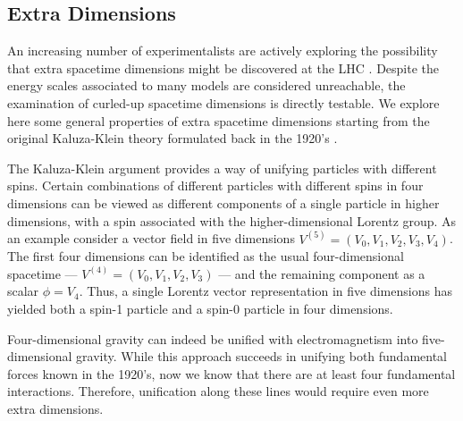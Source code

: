 \subsection{Extra Dimensions}

An increasing number of experimentalists are actively exploring the possibility that extra spacetime dimensions might be discovered at the LHC  \cite{Csaki:2004ay}. Despite the energy scales associated to many models are considered unreachable, the examination of curled-up spacetime dimensions is directly testable. We explore here some general properties of extra spacetime dimensions starting from the original Kaluza-Klein theory formulated back in the 1920's \cite{Kaluza:1921tu}. 

The Kaluza-Klein argument provides a way of unifying particles with different spins. Certain combinations of different particles with different spins in four dimensions can be viewed as different components of a single particle in higher dimensions, with a spin associated with the higher-dimensional Lorentz group. As an example consider a vector field in five dimensions $V^{(5)} = (V_0, V_1, V_2, V_3, V_4)$. The first four dimensions can be identified as the usual four-dimensional spacetime --- $V^{(4)} = (V_0, V_1, V_2, V_3)$  --- and the remaining component as a scalar $\phi = V_4$. Thus, a single Lorentz vector representation in five dimensions has yielded both a spin-1 particle and a spin-0 particle in four dimensions. 



Four-dimensional gravity can indeed be unified with electromagnetism into five-dimensional gravity. While this approach succeeds in unifying both fundamental forces known in the 1920's, now we know that there are at least four fundamental interactions. Therefore, unification along these lines would require even more extra dimensions.

